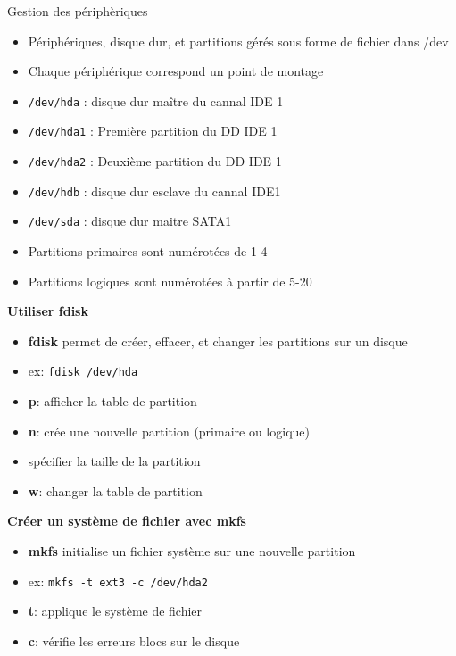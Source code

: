 \documentclass[french]{beamer}
\begin{document}
\begin{frame}
Gestion des périphèriques
\begin{itemize}
\item Périphériques, disque dur, et partitions gérés sous forme de fichier dans /dev
\item Chaque périphérique correspond un point de montage
\item \texttt{/dev/hda} : disque dur maître du cannal IDE 1
\item \texttt{/dev/hda1} : Première partition du DD IDE 1
\item \texttt{/dev/hda2} : Deuxième partition du DD IDE 1
\item \texttt{/dev/hdb} : disque dur esclave du cannal IDE1
\item \texttt{/dev/sda} : disque dur maitre SATA1
\item Partitions primaires sont numérotées de 1-4
\item Partitions logiques sont numérotées à partir de 5-20
\end{itemize}
\end{frame}

\begin{frame}
\textbf{Utiliser fdisk}
\begin{itemize}
\item \textbf{fdisk} permet de créer, effacer, et changer les partitions sur
un disque
\item ex: \texttt{fdisk /dev/hda}
\item \textbf{p}: afficher la table de partition
\item \textbf{n}: crée une nouvelle partition (primaire ou logique)
\item spécifier la taille de la partition
\item \textbf{w}: changer la table de partition
\end{itemize}
\end{frame}

\begin{frame}
\textbf{Créer un système de fichier avec mkfs}
\begin{itemize}
\item \textbf{mkfs} initialise un fichier système sur une nouvelle partition
\item ex: \texttt{mkfs -t ext3 -c /dev/hda2}
\item \textbf{t}: applique le système de fichier
\item \textbf{c}: vérifie les erreurs blocs sur le disque
\end{itemize}
\end{frame}
\end{document}
